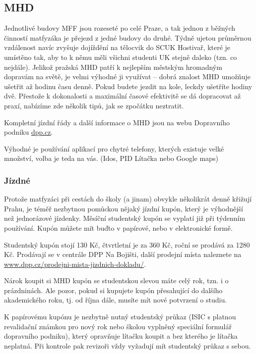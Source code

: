 \subsection{MHD}
Jednotlivé budovy MFF jsou rozeseté po celé Praze, a tak jednou z běžných
činností matfyzáka je přejezd z jedné budovy do druhé. Týdně ujetou průměrnou
vzdálenost navíc zvyšuje dojíždění na tělocvik do SCUK Hostivař, které je
umístěno tak, aby to k němu měli všichni studenti UK stejně daleko (tzn. co
nejdále). Jelikož pražská MHD patří k nejlepším městským hromadným dopravám na
světě, je velmi výhodné ji využívat -- dobrá znalost MHD umožňuje ušetřit až
hodinu času denně. Pokud budete jezdit na kole, leckdy ušetříte hodiny dvě.
Přestože k dokonalosti a maximální časové efektivitě se dá dopracovat až praxí,
nabízíme zde několik tipů, jak se zpočátku neztratit.

Kompletní jízdní řády a další informace o MHD jsou na webu Dopravního podniku
\url{dpp.cz}.

Výhodné je používání aplikací pro chytré telefony, kterých existuje velké množství, volba je teda na vás. (Idos, PID Lítačka nebo Google maps)


\subsubsection{Jízdné}
Protože matfyzáci při cestách do školy (a jinam) obvykle několikrát denně
křižují Prahu, je téměř nezbytnou pomůckou nějaký jízdní kupón, který je
výhodnější než jednorázové jízdenky. Měsíční studentský kupón se vyplatí již při
týdenním používání. Kupón můžete mít buďto v papírové, nebo v elektronické
formě.

Studentský kupón stojí 130 Kč, čtvrtletní je za 360 Kč, roční se prodává za 1280 Kč. 
Prodávají se v centrále DPP Na Bojišti, další prodejní místa naleznete na \url{www.dpp.cz/prodejni-mista-jizdnich-dokladu/}.

Nárok koupit si MHD kupón se studentskou slevou máte celý rok, tzn. i o
prázdninách. Ale pozor, pokud si kupujete kupón přesahující do dalšího
akademického roku, tj. od října dále, musíte mít nové potvrzení o studiu.

K papírovému kupónu je nezbytně nutný studentský průkaz (ISIC s platnou
revalidační známkou pro nový rok nebo školou vyplněný speciální formulář
dopravního podniku), který opravňuje lítačku koupit a bez kterého je lítačka
neplatná. Při kontrole pak revizoři vždy vyžadují mít studentský průkaz s sebou.


